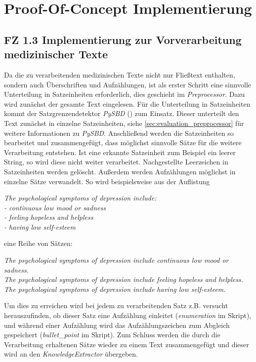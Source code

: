 \chapter{Proof-Of-Concept Implementierung}
\label{ch:implementierung}


\section{FZ 1.3 Implementierung zur Vorverarbeitung medizinischer Texte}
\label{sec:FZ1.3} 

Da die zu verarbeitenden medizinischen Texte nicht nur Fließtext enthalten, sondern auch Überschriften und Aufzählungen, ist als erster Schritt eine sinnvolle Unterteilung in Satzeinheiten erforderlich, dies geschieht im \emph{Preprocessor}. Dazu wird zunächst der gesamte Text eingelesen. Für die Unterteilung in Satzeinheiten kommt der Satzgrenzendetektor \emph{PySBD} (\cite{sadvilkar_pysbd_2020}) zum Einsatz. Dieser unterteilt den Text zunächst in einzelne Satzeinheiten, siehe \ref{sec:evaluation_preprocessor} für weitere Informationen zu \emph{PySBD}. Anschließend werden die Satzeinheiten so bearbeitet und zusammengefügt, dass möglichst sinnvolle Sätze für die weitere Verarbeitung entstehen. Ist eine erkannte Satzeinheit zum Beispiel ein leerer String, so wird diese nicht weiter verarbeitet. Nachgestellte Leerzeichen in Satzeinheiten werden gelöscht. Außerdem werden Aufzählungen möglichst in einzelne Sätze verwandelt. So wird beispielsweise aus der Auflistung\\
\begin{addmargin}{10pt}
\emph{
	The psychological symptoms of depression include:\\
	- continuous low mood or sadness\\
	- feeling hopeless and helpless\\
	- having low self-esteem
}
\end{addmargin}
\vspace*{5mm}
eine Reihe von Sätzen:\\
\begin{addmargin}{10pt}
\emph{
	The psychological symptoms of depression include continuous low mood or sadness.\\
	The psychological symptoms of depression include feeling hopeless and helpless.\\
	The psychological symptoms of depression include having low self-esteem.\\
}
\end{addmargin}
Um dies zu erreichen wird bei jedem zu verarbeitenden Satz z.B. versucht herauszufinden, ob dieser Satz eine Aufzählung einleitet (\emph{enumeration} im Skript), und während einer Aufzählung wird das Aufzählungszeichen zum Abgleich gespeichert (\emph{bullet\_point} im Skript). Zum Schluss werden die durch die Verarbeitung erhaltenen Sätze wieder zu einem Text zusammengefügt und dieser wird an den \emph{KnowledgeExtractor} übergeben.\\
